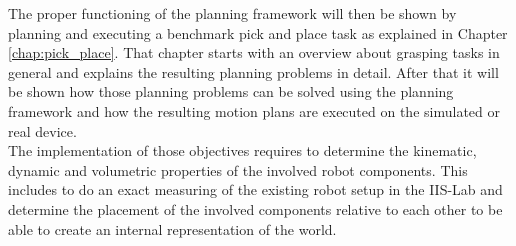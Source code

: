 The proper functioning of the planning framework will then be shown by planning and executing a benchmark pick and place task as explained in Chapter \ref{chap:pick_place}. That chapter starts with an overview about grasping tasks in general and explains the resulting planning problems in detail. After that it will be shown how those planning problems can be solved using the planning framework and how the resulting motion plans are executed on the simulated or real device.\\

The implementation of those objectives requires to determine the kinematic, dynamic and volumetric properties of the involved robot components. This includes to do an exact measuring of the existing robot setup in the IIS-Lab and determine the placement of the involved components relative to each other to be able to create an internal representation of the world. 

